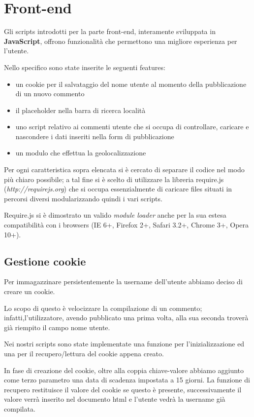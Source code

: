 \section{Front-end}
Gli scripts introdotti per la parte front-end, interamente sviluppata in \textbf{JavaScript}, offrono funzionalità che permettono una migliore esperienza per l'utente.


Nello specifico sono state inserite le seguenti features:
\begin {itemize}
\item un cookie per il salvataggio del nome utente al momento della pubblicazione di un nuovo commento
\item il placeholder nella barra di ricerca località
\item uno script relativo ai commenti utente che si occupa di controllare, caricare e nascondere i dati inseriti nella form di pubblicazione 
\item un modulo che effettua la geolocalizzazione 
\end {itemize} 
Per ogni caratteristica sopra elencata si è cercato di separare il codice nel modo più chiaro possibile; a tal fine si è scelto di utilizzare la libreria require.js (\textit{http://requirejs.org}) che si occupa essenzialmente di caricare files situati in percorsi diversi modularizzando quindi i vari scripts.


Require.js si è dimostrato un valido \textit{module loader} anche per la sua estesa compatibilità con i browsers (IE 6+, Firefox 2+, Safari 3.2+, Chrome 3+, Opera 10+).

\subsection{Gestione cookie}
Per immagazzinare persistentemente la username dell'utente abbiamo deciso di creare un cookie. 

Lo scopo di questo è velocizzare la compilazione di un commento; infatti,l'utilizzatore, avendo pubblicato una prima volta, alla sua seconda troverà già riempito il campo nome utente.

Nei nostri scripts sono state implementate una funzione per l'inizializzazione ed una per il recupero/lettura del cookie appena creato.


In fase di creazione del cookie, oltre alla coppia chiave-valore abbiamo aggiunto come terzo parametro una data di scadenza impostata a 15 giorni.
La funzione di recupero restituisce il valore del cookie se questo è presente, successivamente il valore verrà inserito nel documento html e l'utente vedrà la username già compilata.

